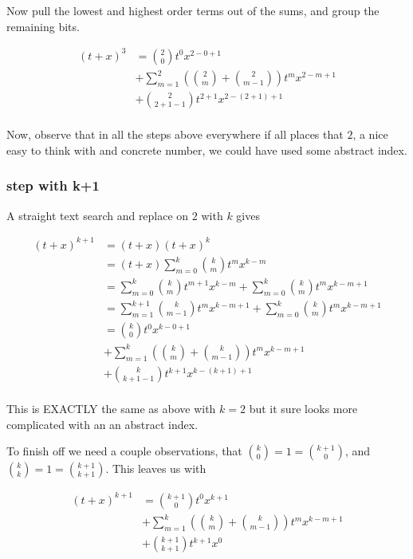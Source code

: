 Now pull the lowest and highest order terms out of the sums, and group the
remaining bits.

\begin{align*}
(t + x)^3 
&= 
 \binom{2}{0} t^{0} x^{2 - 0 + 1} \\
&+ \sum_{m=1}^{2} \left( \binom{2}{m} + \binom{2}{m-1} \right) t^{m} x^{2 - m + 1} \\
&+ \binom{2}{2 + 1 -1} t^{2 + 1} x^{2 - (2 + 1) + 1}
\\
\end{align*}

Now, observe that in all the steps above everywhere if all places that $2$, a nice easy to think with and concrete number, we could have used some
abstract index.

\subsubsection{step with k+1}

A straight text search and replace on $2$ with $k$ gives

\begin{align*}
(t + x)^{k+1}
&= (t + x)(t + x)^k  \\
&= (t + x)\sum_{m=0}^k \binom{k}{m} t^m x^{k-m} \\
&= 
\sum_{m=0}^k \binom{k}{m} t^{m+1} x^{k-m}
+ \sum_{m=0}^k \binom{k}{m} t^{m} x^{k-m + 1} \\
&= 
\sum_{m=1}^{k + 1} \binom{k}{m-1} t^{m} x^{k - m + 1}
+ \sum_{m=0}^k \binom{k}{m} t^{m} x^{k-m + 1} \\
&= 
 \binom{k}{0} t^{0} x^{k - 0 + 1} \\
&+ \sum_{m=1}^{k} \left( \binom{k}{m} + \binom{k}{m-1} \right) t^{m} x^{k - m + 1} \\
&+ \binom{k}{k + 1 -1} t^{k + 1} x^{k - (k + 1) + 1} \\
\end{align*}

This is EXACTLY the same as above with $k=2$ but it sure looks more complicated with an an abstract index.

To finish off we need a couple observations, that 
$\binom{k}{0} = 1 = \binom{k+1}{0}$, and $\binom{k}{k} = 1 = \binom{k+1}{k+1}$.  This leaves us with

\begin{align*}
(t + x)^{k+1}
&= \binom{k+1}{0} t^{0} x^{k + 1} \\
&+ \sum_{m=1}^{k} \left( \binom{k}{m} + \binom{k}{m-1} \right) t^{m} x^{k - m + 1} \\
&+ \binom{k + 1}{k + 1} t^{k + 1} x^{0} \\
\end{align*}

